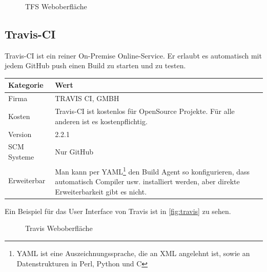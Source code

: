 \begin{figure}[H]
  \centering
  \caption{TFS Weboberfläche \cite{TFS-Marketing}}\label{fig:tfs_release_pipeline}
\end{figure}
\subsection{Travis-CI}
Travis-CI ist ein reiner On-Premise Online-Service. Er erlaubt es automatisch mit jedem GitHub push einen Build zu starten und zu testen.
\begin{center}
  \begin{tabularx}{\textwidth}{lX}
    \toprule
    Kategorie & Wert \\
    \midrule
    Firma &  TRAVIS CI, GMBH \\
		\addlinespace
    Kosten & Travis-CI ist kostenlos für OpenSource Projekte. Für alle anderen ist es kostenpflichtig.\\
		\addlinespace
		Version & 2.2.1 \\
		\addlinespace
		SCM Systeme & Nur GitHub\\
		\addlinespace
		Erweiterbar & Man kann per YAML\footnote{YAML ist eine Auszeichnungssprache, die an XML angelehnt ist, sowie an Datenstrukturen in Perl, Python und C} den Build Agent so konfigurieren, dass automatisch Compiler usw. installiert werden, aber direkte Erweiterbarkeit gibt es nicht.\\
    \bottomrule
  \end{tabularx}
\end{center}
Ein Beispiel für das User Interface von Travis ist in \autoref{fig:travis} zu sehen. 

\begin{figure}[H]
  \centering
  \caption{Travis Weboberfläche \cite{Travis-build}}\label{fig:travis}
\end{figure}